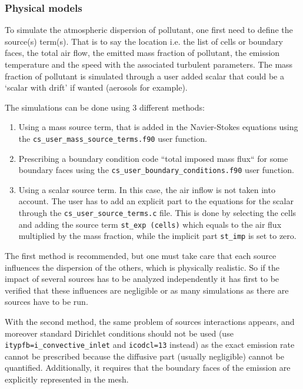 \subsubsection{Physical models}
%
%
To simulate the atmospheric dispersion of pollutant, one first need to define
the source(s) term(s). That is to say the location i.e. the list of cells or
boundary faces, the total air flow, the emitted mass fraction of pollutant,
the emission temperature and the speed with the associated turbulent parameters.
The mass fraction of pollutant is simulated through a user added scalar that
could be a `scalar with drift' if wanted (aerosols for example).

The simulations can be done using 3 different methods:
\begin{enumerate}
\item Using a mass source term, that is added in the Navier-Stokes
equations using the \texttt{cs\_user\_mass\_source\_terms.f90} user function.

\item Prescribing a boundary condition code ``total imposed mass flux`` for
some boundary faces using the \texttt{cs\_user\_boundary\_conditions.f90} user
function.

\item Using a scalar source term. In this case, the air inflow is not taken
into account. The user has to add an explicit part to the equations
for the scalar through the \texttt{cs\_user\_source\_terms.c} file. This is
done by selecting the cells and adding the source term \texttt{st\_exp (cells)}
which equals to the air flux multiplied by the mass fraction, while the
implicit part \texttt{st\_imp} is set to zero.
\end{enumerate}

The first method is recommended, but one must take care that each source
influences the dispersion of the others, which is physically realistic. So
if the impact of several sources has to be analyzed independently it has first
to be verified that these influences are negligible or as many simulations
as there are sources have to be run.

With the second method, the same problem of sources interactions appears, and
moreover standard Dirichlet conditions should not be used (use
\texttt{itypfb=i\_convective\_inlet} and \texttt{icodcl=13} instead) as
the exact emission rate cannot be prescribed because the diffusive part
(usually negligible) cannot be quantified. Additionally, it requires that
the boundary faces of the emission are explicitly represented in the mesh.

